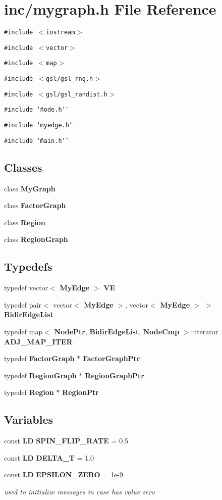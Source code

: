 \section{inc/mygraph.h File Reference}
\label{mygraph_8h}
{\tt \#include $<$iostream$>$}\par
{\tt \#include $<$vector$>$}\par
{\tt \#include $<$map$>$}\par
{\tt \#include $<$gsl/gsl\_\-rng.h$>$}\par
{\tt \#include $<$gsl/gsl\_\-randist.h$>$}\par
{\tt \#include \char`\"{}node.h\char`\"{}}\par
{\tt \#include \char`\"{}myedge.h\char`\"{}}\par
{\tt \#include \char`\"{}main.h\char`\"{}}\par
\subsection*{Classes}
\begin{CompactItemize}
\item 
class {\bf MyGraph}
\item 
class {\bf FactorGraph}
\item 
class {\bf Region}
\item 
class {\bf RegionGraph}
\end{CompactItemize}
\subsection*{Typedefs}
\begin{CompactItemize}
\item 
typedef vector$<$ {\bf MyEdge} $>$ {\bf VE}
\item 
typedef pair$<$ vector$<$ {\bf MyEdge} $>$, vector$<$ {\bf MyEdge} $>$ $>$ {\bf BidirEdgeList}
\item 
typedef map$<$ {\bf NodePtr}, {\bf BidirEdgeList}, {\bf NodeCmp} $>$::iterator {\bf ADJ\_\-MAP\_\-ITER}
\item 
typedef {\bf FactorGraph} $\ast$ {\bf FactorGraphPtr}
\item 
typedef {\bf RegionGraph} $\ast$ {\bf RegionGraphPtr}
\item 
typedef {\bf Region} $\ast$ {\bf RegionPtr}
\end{CompactItemize}
\subsection*{Variables}
\begin{CompactItemize}
\item 
const {\bf LD} {\bf SPIN\_\-FLIP\_\-RATE} = 0.5
\item 
const {\bf LD} {\bf DELTA\_\-T} = 1.0
\item 
const {\bf LD} {\bf EPSILON\_\-ZERO} = 1e-9
\begin{CompactList}\small\item\em used to initialize messages in case has value zero \item\end{CompactList}\end{CompactItemize}


